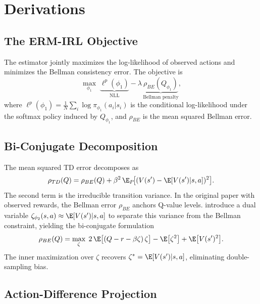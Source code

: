 \documentclass[10pt]{article}
\begin{document}
\section{Derivations}

\subsection{The ERM-IRL Objective}

The estimator jointly maximizes the log-likelihood of observed actions and minimizes the Bellman consistency error. The objective is
\begin{equation}
\label{eq:gladius_obj}
\max_{\phi_1} \; \underbrace{\ell^p(\phi_1)}_{\text{NLL}} - \lambda\,\underbrace{\rho_{BE}(Q_{\phi_1})}_{\text{Bellman penalty}},
\end{equation}
where $\ell^p(\phi_1) = \frac{1}{N}\sum_i \log \pi_{\phi_1}(a_i|s_i)$ is the conditional log-likelihood under the softmax policy induced by $Q_{\phi_1}$, and $\rho_{BE}$ is the mean squared Bellman error.

\subsection{Bi-Conjugate Decomposition}

The mean squared TD error decomposes as
\begin{equation}
\label{eq:biconj}
\rho_{TD}(Q) = \rho_{BE}(Q) + \beta^2\,\E_P\!\bigl[(V(s') - \E[V(s')|s,a])^2\bigr].
\end{equation}
The second term is the irreducible transition variance. In the original paper with observed rewards, the Bellman error $\rho_{BE}$ anchors Q-value levels. \citet{kang2025} introduce a dual variable $\zeta_{\phi_2}(s,a) \approx \E[V(s')|s,a]$ to separate this variance from the Bellman constraint, yielding the bi-conjugate formulation
\begin{equation}
\label{eq:biconj_dual}
\rho_{BE}(Q) = \max_{\zeta}\; 2\,\E\bigl[(Q - r - \beta\zeta)\,\zeta\bigr] - \E\bigl[\zeta^2\bigr] + \E\bigl[V(s')^2\bigr].
\end{equation}
The inner maximization over $\zeta$ recovers $\zeta^* = \E[V(s')|s,a]$, eliminating double-sampling bias.

\subsection{Action-Difference Projection}
\end{document}
